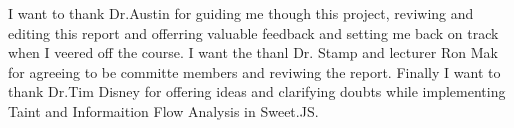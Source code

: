 I want to thank Dr.Austin for guiding me though this project, reviwing and editing this report and offerring valuable feedback and setting me back on track when I veered off the course. I want the thanl Dr. Stamp and lecturer Ron Mak for agreeing to be committe members and reviwing the report. Finally I want to thank Dr.Tim Disney for offering ideas and clarifying doubts while implementing Taint and Informaition Flow Analysis in Sweet.JS.


